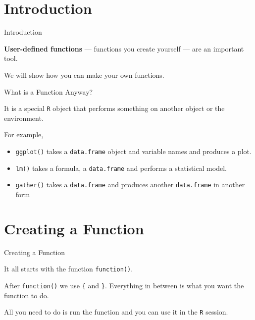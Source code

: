 \section{Introduction}\label{introduction}

\begin{frame}{Introduction}

\textbf{User-defined functions} --- functions you create yourself ---
are an important tool.

We will show how you can make your own functions.

\end{frame}

\begin{frame}[fragile]{What is a Function Anyway?}

It is a special \texttt{R} object that performs something on another
object or the environment.

For example,

\begin{itemize}
\tightlist
\item
  \texttt{ggplot()} takes a \texttt{data.frame} object and variable
  names and produces a plot.
\item
  \texttt{lm()} takes a formula, a \texttt{data.frame} and performs a
  statistical model.
\item
  \texttt{gather()} takes a \texttt{data.frame} and produces another
  \texttt{data.frame} in another form
\end{itemize}

\end{frame}

\section{Creating a Function}\label{creating-a-function}

\begin{frame}[fragile]{Creating a Function}

It all starts with the function \texttt{function()}.

\begin{Shaded}
\begin{Highlighting}[]
\StringTok{ }
\StringTok{ }
\StringTok{ }\OperatorTok{+}\StringTok{ }\OperatorTok{+}\StringTok{ }\OperatorTok{+}\StringTok{ }
\NormalTok{\}}
\end{Highlighting}
\end{Shaded}

After \texttt{function()} we use \texttt{\{} and \texttt{\}}. Everything
in between is what you want the function to do.

All you need to do is run the function and you can use it in the
\texttt{R} session.

\end{frame}

